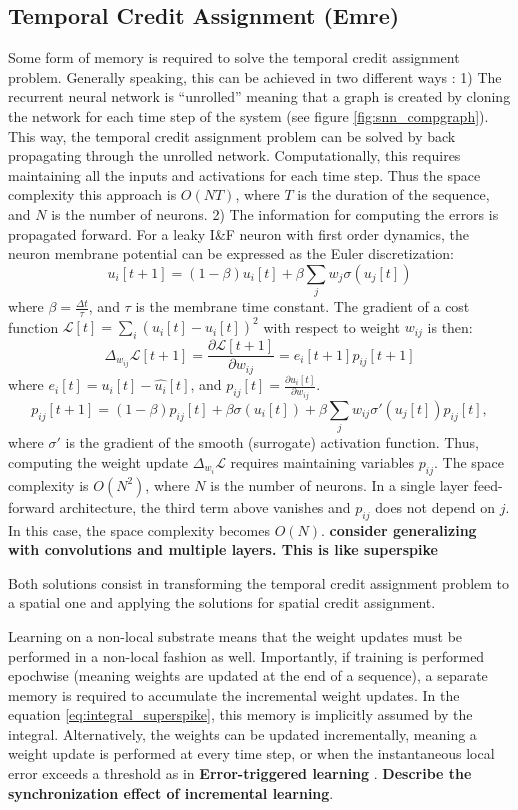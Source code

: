 \documentclass[journal,onecolumn,11pt]{IEEEtran}
\begin{document}
\subsection{Temporal Credit Assignment (Emre)}
Some form of memory is required to solve the temporal credit assignment problem. 
Generally speaking, this can be achieved in two different ways \cite{Williams_Zipser89_learalgo}:
1) The recurrent neural network is ``unrolled'' meaning that a graph is created by cloning the network for each time step of the system (see figure \ref{fig:snn_compgraph}). This way, the temporal credit assignment problem can be solved by back propagating through the unrolled network. Computationally, this requires maintaining all the inputs and activations for each time step. Thus the space complexity this approach is $O(N T)$, where $T$ is the duration of the sequence, and $N$ is the number of neurons.
2) The information for computing the errors is propagated forward.
For a leaky I\&F neuron with first order dynamics, the neuron membrane potential can be expressed as the Euler discretization:
\[
u_i[t+1] = (1-\beta) u_i[t] + \beta \sum_j w_j \sigma(u_j[t])
\]
where $\beta = \frac{\Delta t}{\tau}$, and $\tau$ is the membrane time constant. The gradient of a cost function $\mathcal{L}[t] = \sum_i (u_i[t]-\hat{u_i}[t])^2$ with respect to weight $w_{ij}$ is then:
\[
\Delta_{w_{ij}} \mathcal{L}[t+1] = \frac{\partial \mathcal{L}[t+1]}{\partial w_{ij}} = e_i[t+1] p_{ij}[t+1]
\]
where $e_i[t] = u_i[t]-\hat{u_i}[t]$, and $p_{ij}[t] = \frac{\partial u_i[t]} {\partial w_{ij}}$.
\[
 p_{ij}[t+1] = (1-\beta) p_{ij}[t] + \beta \sigma(u_i[t]) + \beta \sum_j w_{ij} \sigma'(u_j[t]) p_{ij}[t],
\]  
where $\sigma'$ is the gradient of the smooth (surrogate) activation function.
Thus, computing the weight update $\Delta_{w_i} \mathcal{L}$ requires maintaining variables $p_{ij}$. The space complexity is $O(N^2)$, where $N$ is the number of neurons. In a single layer feed-forward architecture, the third term above vanishes and $p_{ij}$ does not depend on $j$. In this case, the space complexity becomes $O(N)$. 
\textbf{consider generalizing with convolutions and multiple layers. This is like superspike}

Both solutions consist in transforming the temporal credit assignment problem to a spatial one and applying the solutions for spatial credit assignment.

Learning on a non-local substrate means that the weight updates must be performed in a non-local fashion as well. Importantly, if training is performed epochwise (meaning weights are updated at the end of a sequence), a separate memory is required to accumulate the incremental weight updates. In the equation \ref{eq:integral_superspike}, this memory is implicitly assumed by the integral. Alternatively, the weights can be updated incrementally, meaning a weight update is performed at every time step, or when the instantaneous local error exceeds a threshold as in 
\textbf{Error-triggered learning} \cite{Neftci18_datapowe}.
\textbf{Describe the synchronization effect of incremental learning}.
\end{document}
